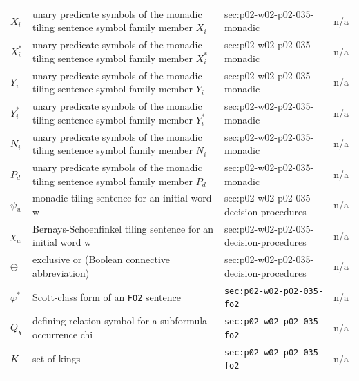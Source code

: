 \begin{longtable}{@{}p{}p{}p{}p{}@{}}
\(X_i\) & unary predicate symbols of the monadic tiling sentence symbol family member \(X_i\) & sec:\allowbreak{}p02-\allowbreak{}w02-\allowbreak{}p02-\allowbreak{}035-\allowbreak{}monadic & n/a \\
\(X_i^{*}\) & unary predicate symbols of the monadic tiling sentence symbol family member \(X_i^{*}\) & sec:\allowbreak{}p02-\allowbreak{}w02-\allowbreak{}p02-\allowbreak{}035-\allowbreak{}monadic & n/a \\
\(Y_i\) & unary predicate symbols of the monadic tiling sentence symbol family member \(Y_i\) & sec:\allowbreak{}p02-\allowbreak{}w02-\allowbreak{}p02-\allowbreak{}035-\allowbreak{}monadic & n/a \\
\(Y_i^{*}\) & unary predicate symbols of the monadic tiling sentence symbol family member \(Y_i^{*}\) & sec:\allowbreak{}p02-\allowbreak{}w02-\allowbreak{}p02-\allowbreak{}035-\allowbreak{}monadic & n/a \\
\(N_i\) & unary predicate symbols of the monadic tiling sentence symbol family member \(N_i\) & sec:\allowbreak{}p02-\allowbreak{}w02-\allowbreak{}p02-\allowbreak{}035-\allowbreak{}monadic & n/a \\
\(P_d\) & unary predicate symbols of the monadic tiling sentence symbol family member \(P_d\) & sec:\allowbreak{}p02-\allowbreak{}w02-\allowbreak{}p02-\allowbreak{}035-\allowbreak{}monadic & n/a \\
\(\psi_w\) & monadic tiling sentence for an initial word w & sec:\allowbreak{}p02-\allowbreak{}w02-\allowbreak{}p02-\allowbreak{}035-\allowbreak{}decision-\allowbreak{}procedures & n/a \\
\(\chi_w\) & Bernays-Schoenfinkel tiling sentence for an initial word w & sec:\allowbreak{}p02-\allowbreak{}w02-\allowbreak{}p02-\allowbreak{}035-\allowbreak{}decision-\allowbreak{}procedures & n/a \\
\(\oplus\) & exclusive or (Boolean connective abbreviation) & sec:\allowbreak{}p02-\allowbreak{}w02-\allowbreak{}p02-\allowbreak{}035-\allowbreak{}decision-\allowbreak{}procedures & n/a \\
\(\varphi^{*}\) & Scott-class form of an \texttt{FO2} sentence & \texttt{sec:\allowbreak{}p02-\allowbreak{}w02-\allowbreak{}p02-\allowbreak{}035-\allowbreak{}fo2} & n/a \\
\(Q_\chi\) & defining relation symbol for a subformula occurrence chi & \texttt{sec:\allowbreak{}p02-\allowbreak{}w02-\allowbreak{}p02-\allowbreak{}035-\allowbreak{}fo2} & n/a \\
\(K\) & set of kings & \texttt{sec:\allowbreak{}p02-\allowbreak{}w02-\allowbreak{}p02-\allowbreak{}035-\allowbreak{}fo2} & n/a \\

\end{longtable}
